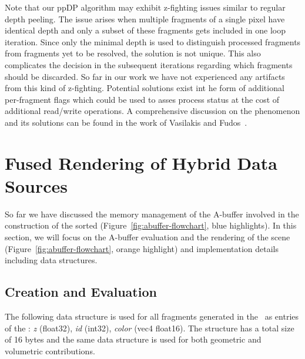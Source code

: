 \documentclass{egpubl}
\newcommand{\yellow}[1]{{\color{Goldenrod}#1}}
\newcommand{\minor}[1]{\yellow{#1}}
\newcommand{\ab}{\mbox{A-buffer}}
\newcommand{\dloop}{ppDP}
\begin{document}
Note that our \dloop{} algorithm may exhibit z-fighting issues similar to regular depth peeling. 
The issue arises when multiple fragments of a single pixel have identical depth and only a subset of these fragments gets included in one loop iteration. 
Since only the minimal depth is used to distinguish processed fragments from fragments yet to be resolved, the solution is not unique.
This also complicates the decision in the subsequent iterations regarding which fragments should be discarded.
So far in our work we have not experienced any artifacts from this kind of z-fighting. 
\minor{
Potential solutions exist int he form of additional per-fragment flags which could be used to asses process status at the cost of additional read/write operations. 
A comprehensive discussion on the phenomenon and its solutions can be found in the work of Vasilakis and Fudos~\cite{Vasilakis2013}. 
}

\section{Fused Rendering of Hybrid Data Sources}
\label{sec:fusion}

So far we have discussed the memory management of the \ab{} involved in the construction of the sorted \bFraglist{} (Figure~\ref{fig:abuffer-flowchart}, blue highlights). 
In this section, we will focus on the \ab{} evaluation and the rendering of the scene (Figure~\ref{fig:abuffer-flowchart}, orange highlight) and implementation details including data structures.

\newcommand{\ccz}{\emph{z}}
\newcommand{\ccid}{\emph{id}}
\newcommand{\cccol}{\emph{color}}

\subsection{\bFraglist{} Creation and Evaluation}

The following data structure is used for all fragments generated in the \sFill\ as entries of the \bFraglist: 
\ccz{} (float32), \ccid{} (int32), \cccol{} (vec4 float16).
The structure has a total size of 16 bytes and the same data structure is used for both geometric and volumetric contributions. 
\end{document}
